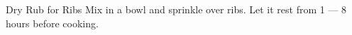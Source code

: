 \documentclass[../cookbook.tex]{subfiles}
\begin{document}
\begin{recipe}{Dry Rub for Ribs}{}{}
    Mix in a bowl and sprinkle over ribs. Let
    it rest from 1 --- 8 hours before cooking.
\end{recipe}
\end{document}
